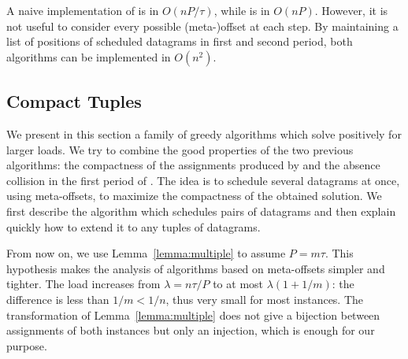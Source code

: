 


A naive implementation of \metaoffset is in $O(n P/\tau)$, while \firstfit is in $O(nP)$.
However, it is not useful to consider every possible (meta-)offset at each step. By maintaining
a list of positions of scheduled datagrams in first and second period, both algorithms can be implemented in $O(n^2)$.


\subsection{Compact Tuples}\label{sec:compacttuple}

We present in this section a family of greedy algorithms which solve \pma positively for larger loads. We try to combine the good properties of the two previous algorithms: the compactness of the assignments produced by \firstfit and the absence collision in the first period of \metaoffset. The idea is to schedule several datagrams at once, using meta-offsets, to maximize the compactness of the obtained solution. We first describe the algorithm which schedules pairs of datagrams and then explain quickly how to extend it to any tuples of datagrams.


From now on, we use Lemma~\ref{lemma:multiple} to assume $P = m\tau$. This hypothesis makes the analysis of algorithms based on meta-offsets simpler and tighter. The load increases from $\lambda = n \tau / P$ to at most $\lambda (1 + 1/m)$: the difference is less than $1/m < 1/n$, thus very small for most instances. The transformation of Lemma~\ref{lemma:multiple} does not give a bijection between assignments of both instances but only an injection, which is enough for our purpose. 

